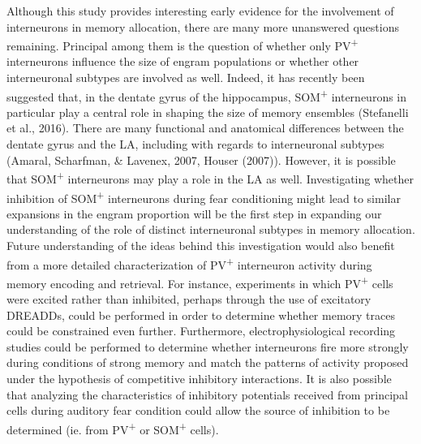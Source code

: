 \documentclass[12pt,a4paper,]{report}
\begin{document}
Although this study provides interesting early evidence for the
involvement of interneurons in memory allocation, there are many more
unanswered questions remaining. Principal among them is the question of
whether only PV\textsuperscript{+} interneurons influence the size of
engram populations or whether other interneuronal subtypes are involved
as well. Indeed, it has recently been suggested that, in the dentate
gyrus of the hippocampus, SOM\textsuperscript{+} interneurons in
particular play a central role in shaping the size of memory ensembles
(Stefanelli et al., 2016). There are many functional and anatomical
differences between the dentate gyrus and the LA, including with regards
to interneuronal subtypes (Amaral, Scharfman, \& Lavenex, 2007, Houser
(2007)). However, it is possible that SOM\textsuperscript{+}
interneurons may play a role in the LA as well. Investigating whether
inhibition of SOM\textsuperscript{+} interneurons during fear
conditioning might lead to similar expansions in the engram proportion
will be the first step in expanding our understanding of the role of
distinct interneuronal subtypes in memory allocation. Future
understanding of the ideas behind this investigation would also benefit
from a more detailed characterization of PV\textsuperscript{+}
interneuron activity during memory encoding and retrieval. For instance,
experiments in which PV\textsuperscript{+} cells were excited rather
than inhibited, perhaps through the use of excitatory DREADDs, could be
performed in order to determine whether memory traces could be
constrained even further. Furthermore, electrophysiological recording
studies could be performed to determine whether interneurons fire more
strongly during conditions of strong memory and match the patterns of
activity proposed under the hypothesis of competitive inhibitory
interactions. It is also possible that analyzing the characteristics of
inhibitory potentials received from principal cells during auditory fear
condition could allow the source of inhibition to be determined (ie.
from PV\textsuperscript{+} or SOM\textsuperscript{+} cells).
\end{document}
